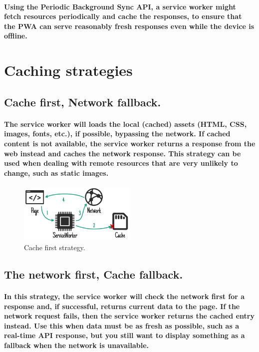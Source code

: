 \documentclass[12pt,a4paper]{article}
\begin{document}
    \paragraph{Using the Periodic Background Sync API, a service worker might fetch resources periodically and cache the responses, to ensure that the PWA can serve reasonably fresh responses even while the device is offline.}

    \section{Caching strategies}

    \subsection{Cache first, Network fallback.}

    \paragraph{The service worker will loads the local (cached) assets (HTML, CSS, images, fonts, etc.), if possible, bypassing the network. If cached content is not available, the service worker returns a response from the web instead and caches the network response. This strategy can be used when dealing with remote resources that are very unlikely to change, such as static images.}

    \begin{figure}[h!]
      \centering
      \includegraphics[width=0.5\textwidth]{cachefirst.png}
      \caption{Cache first strategy.}
    \end{figure}

    \subsection{The network first, Cache fallback.}

    \paragraph{In this strategy, the service worker will check the network first for a response and, if successful, returns current data to the page. If the network request fails, then the service worker returns the cached entry instead. Use this when data must be as fresh as possible, such as a real-time API response, but you still want to display something as a fallback when the network is unavailable.}
\end{document}
